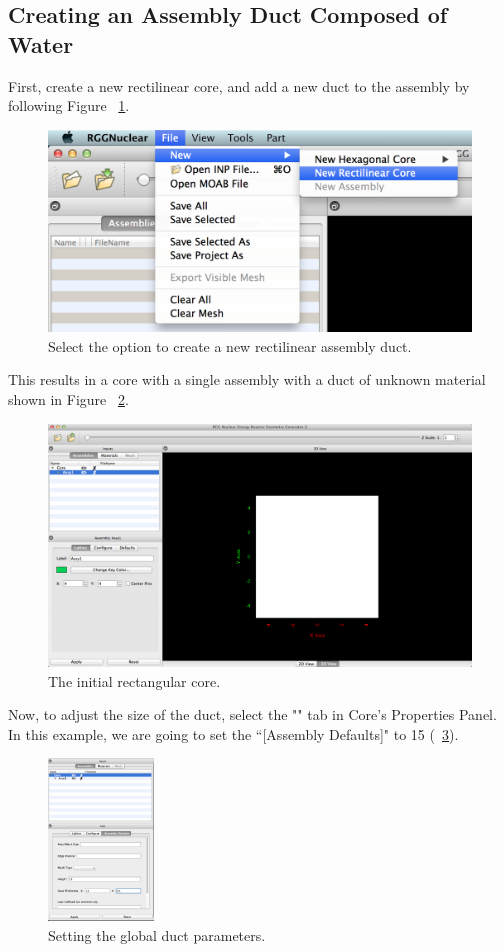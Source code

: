 \subsection{Creating an Assembly Duct Composed of Water}

First, create a new rectilinear core, and add a new duct to the assembly by following Figure ~\ref{fig:Rect1}.

\begin{figure}[htb]
\begin{center}
\includegraphics[width=0.5\linewidth]{Images/rect-1e1.png}
\caption{Select the option to create a new rectilinear assembly duct.}
\label{fig:Rect1}
\end{center}
\end{figure}

This results in a core with a single assembly with a duct of unknown material shown in Figure ~\ref{fig:NewRect}.

\begin{figure}[htb]
\begin{center}
\includegraphics[width=0.5\linewidth]{Images/rect-init-model.png}
\caption{The initial rectangular core.}
\label{fig:NewRect}
\end{center}
\end{figure}

Now, to adjust the size of the duct, select the "" tab in Core's Properties Panel.  In this example, we are going to set the ``[Assembly Defaults]" to 15 (~\ref{fig:SetRectDuctDem}).

\begin{figure}
  \begin{center}
    \includegraphics[width=0.25\textwidth]{Images/rect-set-dim.png}
  \end{center}
 \caption{Setting the global duct parameters.}
\label{fig:SetRectDuctDem}
\end{figure}

